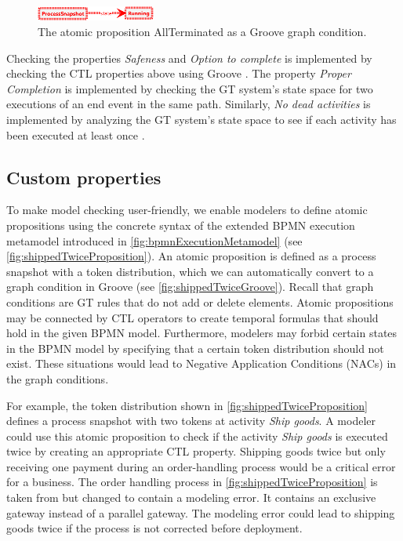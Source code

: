 \documentclass{lmcs} %
\begin{document}
\begin{figure}[ht]
    \centering
    \includegraphics[width=0.35\textwidth]{images/AllTerminated.pdf}
    \caption{The atomic proposition \textsf{AllTerminated} as a Groove graph condition.}
    \label{fig:allTerminated}
\end{figure}

Checking the properties \textit{Safeness} and \textit{Option to complete} is implemented by checking the CTL properties above using Groove \cite{kastenbergModelCheckingDynamic2006, rensinkExplicitStateModel2008}.
The property \textit{Proper Completion} is implemented by checking the GT system's state space for two executions of an end event in the same path.
Similarly, \textit{No dead activities} is implemented by analyzing the GT system's state space to see if each activity has been executed at least once \cite{timkrauterLMCS2024Artifacts2023}.

\subsection{Custom properties} \label{subsec:customProperties}

To make model checking user-friendly, we enable modelers to define atomic propositions using the concrete syntax of the extended BPMN execution metamodel introduced in \autoref{fig:bpmnExecutionMetamodel} (see \autoref{fig:shippedTwiceProposition}).
An atomic proposition is defined as a process snapshot with a token distribution, which we can automatically convert to a graph condition in Groove (see \autoref{fig:shippedTwiceGroove}).
Recall that graph conditions are GT rules that do not add or delete elements.
Atomic propositions may be connected by CTL operators to create temporal formulas that should hold in the given BPMN model. 
Furthermore, modelers may forbid certain states in the BPMN model by specifying that a certain token distribution should not exist.
These situations would lead to Negative Application Conditions (NACs) in the graph conditions. 

For example, the token distribution shown in \autoref{fig:shippedTwiceProposition} defines a process snapshot with two tokens at activity \textit{Ship goods}.
A modeler could use this atomic proposition to check if the activity \textit{Ship goods} is executed twice by creating an appropriate CTL property.
Shipping goods twice but only receiving one payment during an order-handling process would be a critical error for a business.
The order handling process in \autoref{fig:shippedTwiceProposition} is taken from \cite{ruckerPracticalProcessAutomation2021} but changed to contain a modeling error.
It contains an exclusive gateway instead of a parallel gateway.
The modeling error could lead to shipping goods twice if the process is not corrected before deployment.
\end{document}
